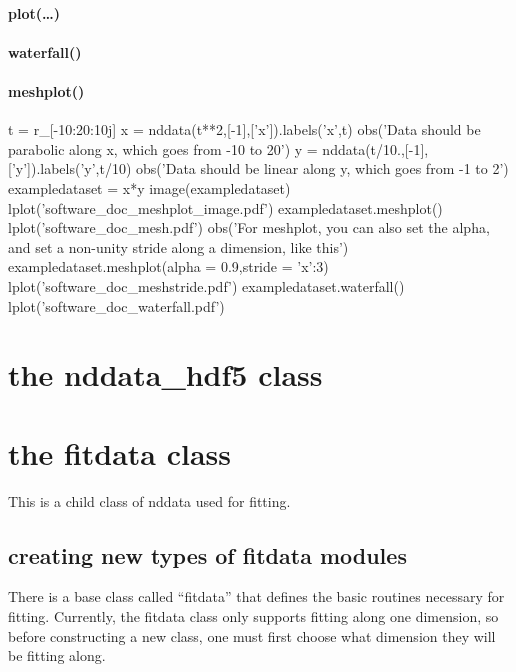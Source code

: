 \paragraph{plot(\ldots)}
\paragraph{waterfall()}

\paragraph{meshplot()}


\begin{python}
t = r_[-10:20:10j]
x = nddata(t**2,[-1],['x']).labels('x',t)
obs('Data should be parabolic along x, which goes from -10 to 20')
y = nddata(t/10.,[-1],['y']).labels('y',t/10)
obs('Data should be linear along y, which goes from -1 to 2')
exampledataset = x*y
image(exampledataset)
lplot('software_doc_meshplot_image.pdf')
exampledataset.meshplot()
lplot('software_doc_mesh.pdf')
obs('For meshplot, you can also set the alpha, and set a non-unity stride along a dimension, like this')
exampledataset.meshplot(alpha = 0.9,stride = {'x':3})
lplot('software_doc_meshstride.pdf')
exampledataset.waterfall()
lplot('software_doc_waterfall.pdf')
\end{python}
\section{the nddata\_hdf5 class}
\section{the fitdata class}
This is a child class of nddata used for fitting.
\subsection{creating new types of fitdata modules}
There is a base class called ``fitdata'' that
    defines the basic routines necessary for fitting.
Currently, the fitdata class only supports fitting
    along one dimension, so before constructing a new class,
    one must first choose what dimension they will be fitting along.

